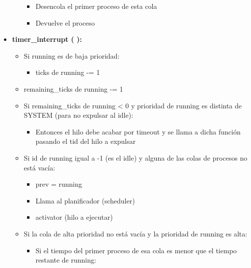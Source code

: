 \documentclass[10pt, spanish, pdftex]{template/UC3M_document}
\begin{document}
\begin{itemize}
\begin{itemize}
\begin{itemize}
     \setlength{\itemsep}{-1.5mm}
            \item Desencola el primer proceso de esta cola
            \item Devuelve el proceso
        \end{itemize}
    \end{itemize}
    \item \textbf{timer\_interrupt ( ):}
    \vspace{-2mm}
    \begin{itemize}
     \setlength{\itemsep}{-1.5mm}
        \item Si running es de baja prioridad:
        \vspace{-2mm}
    \begin{itemize}
     \setlength{\itemsep}{-1.5mm}
            \item ticks de running -= 1
        \end{itemize}
        \item remaining\_ticks de running -= 1
        \item Si remaining\_ticks de running < 0 y prioridad de running es distinta de SYSTEM (para no expulsar al idle):
        \vspace{-2mm}
    \begin{itemize}
     \setlength{\itemsep}{-1.5mm}
            \item Entonces el hilo debe acabar por timeout y se llama a dicha función pasando el tid del hilo a expulsar
        \end{itemize}
        \item Si id de running igual a -1 (es el idle) y alguna de las colas de procesos no está vacía:
        \vspace{-2mm}
    \begin{itemize}
     \setlength{\itemsep}{-1.5mm}
            \item prev = running
            \item Llama al planificador (scheduler)
            \item activator (hilo a ejecutar)
        \end{itemize}
        \item Si la cola de alta prioridad no está vacía y la prioridad de running es alta:
        \vspace{-2mm}
    \begin{itemize}
     \setlength{\itemsep}{-1.5mm}
            \item Si el tiempo del primer proceso de esa cola es menor que el tiempo restante de running:

\end{itemize}
\end{itemize}
\end{itemize}
\end{document}

